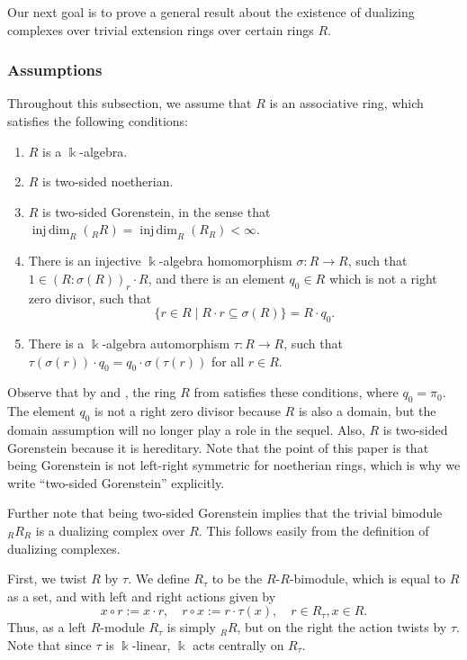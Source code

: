 \documentclass{amsart}
\theoremstyle{definition}
\renewcommand{\k}{\Bbbk}
\newcommand{\injdim}{\operatorname{inj\,dim}}
\numberwithin{equation}{section}
\begin{document}
Our next goal is to prove a general result about the existence of dualizing complexes over trivial extension rings over certain rings $R$. 

\subsubsection{Assumptions}\label{sec:assum} Throughout this subsection, we assume that $R$ is an associative ring,
which satisfies the following conditions:
\begin{enumerate}
\item $R$ is a $\k$-algebra.
\item $R$ is two-sided noetherian.
\item $R$ is two-sided Gorenstein, in the sense that $\injdim_R({}_R R) = \injdim_R(R_R) < \infty$.
\item There is an injective $\k$-algebra homomorphism $\sigma:R \to R$,
such that $1 \in (R:\sigma(R))_r\cdot R$,
and there is an element $q_0 \in R$ which is not a right zero divisor,
such that 
\[
\{r \in R \mid R\cdot r \subseteq \sigma(R)\} = R \cdot q_0.
\]
\item There is a $\k$-algebra automorphism $\tau:R \to R$,
such that $\tau(\sigma(r)) \cdot q_0 = q_0 \cdot \sigma(\tau(r))$ for all $r \in R$.
\end{enumerate}

Observe that by  and ,
the ring $R$ from  satisfies these conditions,
where $q_0 = \pi_0$. 
The element $q_0$ is not a right zero divisor because $R$ is also a domain,
but the domain assumption will no longer play a role in the sequel.
Also, $R$ is two-sided Gorenstein because it is hereditary.
Note that the point of this paper is that being Gorenstein is not left-right symmetric for noetherian rings, which is why we write ``two-sided Gorenstein'' explicitly.

Further note that being two-sided Gorenstein implies that the trivial bimodule ${}_R R_R$ is a dualizing complex over $R$. This follows easily from the definition of dualizing complexes.

First, we twist $R$ by $\tau$. 
We define $R_{\tau}$ to be the $R$-$R$-bimodule, which is equal to $R$ as a set,
and with left and right actions given by 
\[
x\circ r := x\cdot r, \quad   r\circ x := r\cdot\tau(x), \quad r \in R_{\tau}, x\in R.
\]
Thus, as a left $R$-module $R_{\tau}$ is simply ${}_R R$, but on the right the action twists by $\tau$. Note that since $\tau$ is $\k$-linear, $\k$ acts centrally on $R_{\tau}$.
\end{document}
